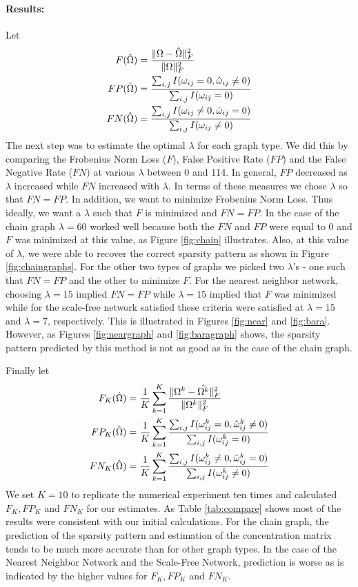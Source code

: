 \documentclass[12pt, leqno]{article}
\providecommand{\norm}[1]{\lVert#1\rVert}
\let\oldhat\hat
\renewcommand{\hat}[1]{\oldhat{{#1}}}
\def\om{\ensuremath\Omega}
\begin{document}
\paragraph{Results:} Let 
\begin{align*}
F(\hat{\om}) &= \frac{\norm{\om-\hat{\om}}_F^2}{\norm{\om}_F^2}\\
FP(\hat{\om}) &= \frac{\sum_{i,j} I(\omega_{ij}=0,\hat{\omega}_{ij}\not=0)}{\sum_{i,j} I(\omega_{ij}=0)}\\
FN(\hat{\om}) &= \frac{\sum_{i,j} I(\omega_{ij}\not=0,\hat{\omega}_{ij}=0)}{\sum_{i,j} I(\omega_{ij}\not=0)}
\end{align*}
The next step was to estimate the optimal $\lambda$ for each graph type. We did
this by comparing the Frobenius Norm Loss ($F$), False Positive Rate
($FP$) and the False Negative Rate ($FN)$ at various $\lambda$ between 0 and
114. In general, $FP$ decreased as
$\lambda$ increased while $FN$
increased with $\lambda$. In terms of these measures we chose
$\lambda$ so that $FN = FP$. In addition, we want to minimize
Frobenius Norm Loss. Thus ideally, we want a $\lambda$ such that $F$
is minimized and $FN=FP$. In the case of the chain graph $\lambda
= 60$ worked well because both the $FN$ and $FP$
were equal to 0 and $F$ was minimized at this value, as Figure \ref{fig:chain} illustrates. Also, at
this value of $\lambda$, we were able to recover the correct sparsity
pattern as shown in Figure \ref{fig:chaingraphs}. For the
other two types of graphs we picked two $\lambda$'s - one such that
$FN=FP$ and the other to minimize $F$. For the
nearest neighbor network, choosing $\lambda = 15$ implied $FN=FP$
while $\lambda = 15$ implied that $F$ was minimized while for the scale-free network
satisfied these criteria  were satisfied at $\lambda = 15$ and
$\lambda = 7$, respectively. This is illustrated in Figures \ref{fig:near} and
\ref{fig:bara}. However, as Figures \ref{fig:neargraph} and
\ref{fig:baragraph} shows, the sparsity pattern predicted by this
method is not as good as in the case of the chain graph.

Finally let \begin{align*}
F_K(\hat{\om}) &=\frac{1}{K} \sum_{k=1}^K \frac{\norm{\om^k-\hat{\om^k}}_F^2}{\norm{\om^k}_F^2}\\
FP_K(\hat{\om}) &= \frac{1}{K} \sum_{k=1}^K\frac{\sum_{i,j} I(\omega^k_{ij}=0,\hat{\omega}^k_{ij}\not=0)}{\sum_{i,j} I(\omega^k_{ij}=0)}\\
FN_K(\hat{\om}) &= \frac{1}{K} \sum_{k=1}^K \frac{\sum_{i,j}
     I(\omega^k_{ij}\not=0,\hat{\omega}^k_{ij}=0)}{\sum_{i,j}
     I(\omega^k_{ij}\not=0)}
\end{align*}
We set $K=10$ to replicate the numerical experiment ten times and
calculated $F_K, FP_K$ and $FN_K$ for our estimates. As Table \ref{tab:compare} shows most of the results were
consistent with our initial calculations. For the chain graph, the prediction of the
sparsity pattern and estimation of the concentration matrix tends to
be much more accurate than for other graph types. In the case of the Nearest
Neighbor Network and the Scale-Free Network, prediction is worse as is
indicated by the higher values for $F_K, FP_K$ and $FN_K$.
\end{document}
